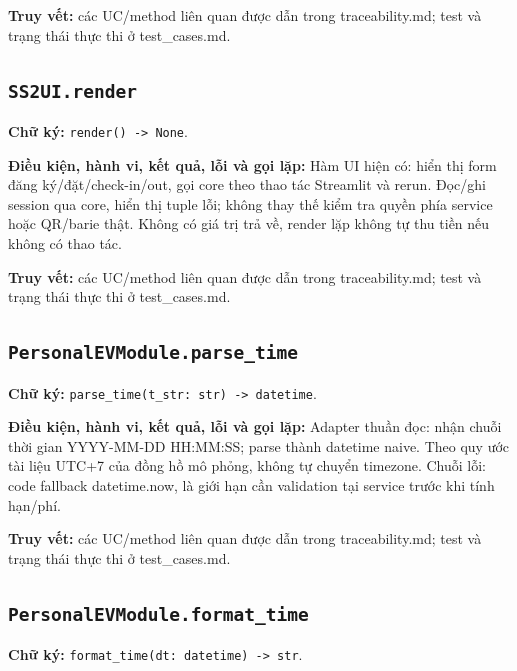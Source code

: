 \documentclass[11pt,a4paper]{article}
\begin{document}
\textbf{Truy vết:} các UC/method liên quan được dẫn trong
traceability.md; test và trạng thái thực thi ở test\_cases.md.

\hypertarget{ss2ui.render}{%
\subsection{\texorpdfstring{\texttt{SS2UI.render}}{SS2UI.render}}\label{ss2ui.render}}

\textbf{Chữ ký:} \texttt{render()\ -\textgreater{}\ None}.

\textbf{Điều kiện, hành vi, kết quả, lỗi và gọi lặp:} Hàm UI hiện có:
hiển thị form đăng ký/đặt/check-in/out, gọi core theo thao tác Streamlit
và rerun. Đọc/ghi session qua core, hiển thị tuple lỗi; không thay thế
kiểm tra quyền phía service hoặc QR/barie thật. Không có giá trị trả về,
render lặp không tự thu tiền nếu không có thao tác.

\textbf{Truy vết:} các UC/method liên quan được dẫn trong
traceability.md; test và trạng thái thực thi ở test\_cases.md.

\hypertarget{personalevmodule.parse_time}{%
\subsection{\texorpdfstring{\texttt{PersonalEVModule.parse\_time}}{PersonalEVModule.parse\_time}}\label{personalevmodule.parse_time}}

\textbf{Chữ ký:}
\texttt{parse\_time(t\_str:\ str)\ -\textgreater{}\ datetime}.

\textbf{Điều kiện, hành vi, kết quả, lỗi và gọi lặp:} Adapter thuần đọc:
nhận chuỗi thời gian YYYY-MM-DD HH:MM:SS; parse thành datetime naive.
Theo quy ước tài liệu UTC+7 của đồng hồ mô phỏng, không tự chuyển
timezone. Chuỗi lỗi: code fallback datetime.now, là giới hạn cần
validation tại service trước khi tính hạn/phí.

\textbf{Truy vết:} các UC/method liên quan được dẫn trong
traceability.md; test và trạng thái thực thi ở test\_cases.md.

\hypertarget{personalevmodule.format_time}{%
\subsection{\texorpdfstring{\texttt{PersonalEVModule.format\_time}}{PersonalEVModule.format\_time}}\label{personalevmodule.format_time}}

\textbf{Chữ ký:}
\texttt{format\_time(dt:\ datetime)\ -\textgreater{}\ str}.
\end{document}
